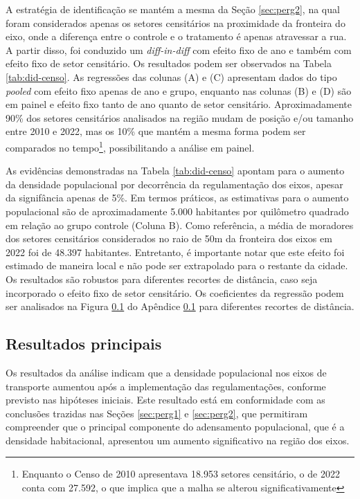 A estratégia de identificação se mantém a mesma da Seção \ref{sec:perg2}, na qual foram considerados apenas os setores censitários na proximidade da fronteira do eixo, onde a diferença entre o controle e o tratamento é apenas atravessar a rua. A partir disso, foi conduzido um \textit{diff-in-diff} com efeito fixo de ano e também com efeito fixo de setor censitário. Os resultados podem ser observados na Tabela \ref{tab:did-censo}. As regressões das colunas (A) e (C) apresentam dados do tipo \textit{pooled} com efeito fixo apenas de ano e grupo, enquanto nas colunas (B) e (D) são em painel e efeito fixo tanto de ano quanto de setor censitário. Aproximadamente 90\% dos setores censitários analisados na região mudam de posição e/ou tamanho entre 2010 e 2022, mas os 10\% que mantém a mesma forma podem ser comparados no tempo\footnote{Enquanto o Censo de 2010 apresentava 18.953 setores censitário, o de 2022 conta com 27.592, o que implica que a malha se alterou significativamente}, possibilitando a análise em painel. 



As evidências demonstradas na Tabela \ref{tab:did-censo} apontam para o aumento da densidade populacional por decorrência da regulamentação dos eixos, apesar da signifância apenas de 5\%. Em termos práticos, as estimativas para o aumento populacional são de aproximadamente 5.000 habitantes por quilômetro quadrado em relação ao grupo controle (Coluna B). Como referência, a média de moradores dos setores censitários considerados no raio de 50m da fronteira dos eixos em 2022 foi de 48.397 habitantes. Entretanto, é importante notar que este efeito foi estimado de maneira local e não pode ser extrapolado para o restante da cidade. Os resultados são robustos para diferentes recortes de distância, caso seja incorporado o efeito fixo de setor censitário. Os coeficientes da regressão podem ser analisados na Figura \ref{} do Apêndice \ref{} para diferentes recortes de distância.

\subsection{Resultados principais}

Os resultados da análise indicam que a densidade populacional nos eixos de transporte aumentou após a implementação das regulamentações, conforme previsto nas hipóteses iniciais. Este resultado está em conformidade com as conclusões trazidas nas Seções \ref{sec:perg1} e \ref{sec:perg2}, que permitiram compreender que o principal componente do adensamento populacional, que é a densidade habitacional, apresentou um aumento significativo na região dos eixos.

